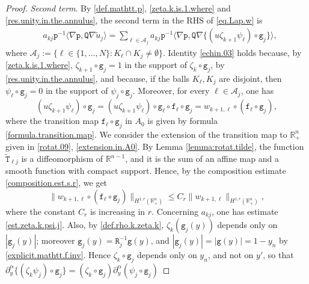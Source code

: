 \documentclass[10pt,a4paper]{amsart}
\newcommand{\R}{{\mathbb R}}
\renewcommand{\a}{\alpha}
\newcommand{\grad}{\nabla}
\newcommand{\la}{\langle}
\newcommand{\mA}{\mathcal{A}}
\newcommand{\pa}{\partial}
\newcommand{\ra}{\rangle}
\begin{document}
\begin{proof}
\emph{Second term}. 
By \eqref{def.mathtt.p}, 
\eqref{zeta.k.is.1.where} and \eqref{res.unity.in.the.annulus}, 
the second term in the RHS of \eqref{eq.Lap.w} is 
\begin{align}
& a_{kj} \mathtt p^{-1} 
\la \grad \mathtt p , \mathtt Q \grad \tilde u_{j} \ra
= \sum_{\ell \in \mA_j} a_{kj} \mathtt p^{-1} \la \grad \mathtt p , \mathtt Q \grad 
\{ (u \zeta_{k+1} \psi_\ell) \circ \mathtt g_j \} \ra,
\label{echin.03}
\end{align}
where $\mA_j := \{ \ell \in \{ 1, \ldots, N \} : K_\ell \cap K_j \neq \emptyset \}$. 
Identity \eqref{echin.03} holds because, by \eqref{zeta.k.is.1.where}, 
$\zeta_{k+1} \circ \mathtt g_j = 1$ in the support of $\zeta_k \circ \mathtt g_j$, 
by \eqref{res.unity.in.the.annulus},  
and because, if the balls $K_\ell, K_j$ are disjoint, 
then $\psi_\ell \circ \mathtt g_j = 0$ in the support of $\psi_j \circ \mathtt g_j$. 
Moreover, for every $\ell \in \mA_j$, one has 
\begin{equation} \label{transition.w}
(u \zeta_{k+1} \psi_\ell) \circ \mathtt g_j 
= (u \zeta_{k+1} \psi_\ell) \circ \mathtt g_\ell \circ \mathtt f_\ell \circ \mathtt g_j
= w_{k+1,\ell} \circ (\mathtt f_\ell \circ \mathtt g_j),
\end{equation}
where the transition map $\mathtt f_\ell \circ \mathtt g_j$ 
in $A_0$ is given by formula \eqref{formula.transition.map}.
We consider the extension of the transition map to $\R^n_+$ 
given in \eqref{rotat.09}, \eqref{extension.in.A0}. 
By Lemma \ref{lemma:rotat.tilde}, the function $\tilde{\mathtt T}_{\ell j}$ 
is a diffeomorphism of $\R^{n-1}$, and it is the sum 
of an affine map and a smooth function with compact support. 
Hence, by the composition estimate \eqref{composition.est.s.r}, we get
\begin{equation}  \label{echin.04}
\| w_{k+1,\ell} \circ (\mathtt f_\ell \circ \mathtt g_j) \|_{H^{1,r}(\R^n_+)}
\leq C_r \|  w_{k+1,\ell} \|_{H^{1,r}(\R^n_+)},
\end{equation}
where the constant $C_r$ is increasing in $r$. 
Concerning $a_{kj}$, one has estimate \eqref{est.zeta.k.psi.j}. 
Also, by \eqref{def.rho.k.zeta.k}, 
$\zeta_k(\mathtt g_j(y))$ depends only on $|\mathtt g_j(y)|$; 
moreover $\mathtt g_j(y) = \mathtt R_j^{-1} \mathtt g(y)$, 
and $|\mathtt g_j(y)| = |\mathtt g(y)| = 1 - y_n$ by \eqref{explicit.mathtt.f.inv}.  
Hence $\zeta_k \circ \mathtt g_j$ depends only on $y_n$, and not on $y'$, 
so that $\pa_y^\a \{ (\zeta_k \psi_j) \circ \mathtt g_j \} 
= (\zeta_k \circ \mathtt g_j) \pa_y^\a (\psi_j \circ \mathtt g_j)$ 

\end{proof}
\end{document}
